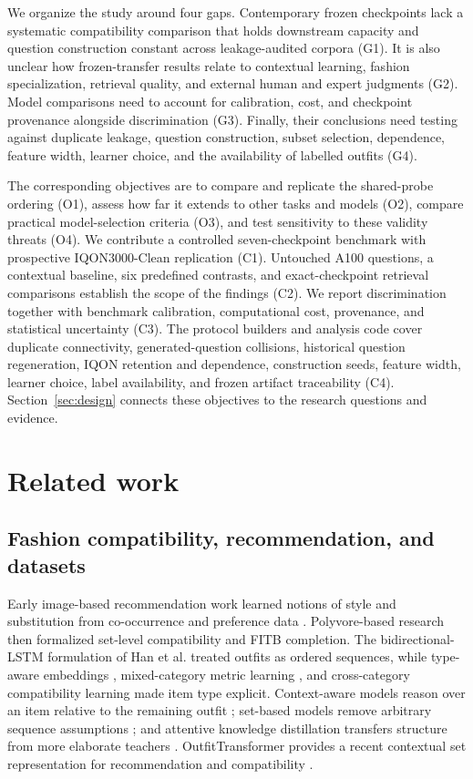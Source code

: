 \documentclass[pdflatex,sn-mathphys-num,iicol]{sn-jnl}
\begin{document}
We organize the study around four gaps. Contemporary frozen checkpoints lack a systematic compatibility comparison that holds downstream capacity and question construction constant across leakage-audited corpora (G1). It is also unclear how frozen-transfer results relate to contextual learning, fashion specialization, retrieval quality, and external human and expert judgments (G2). Model comparisons need to account for calibration, cost, and checkpoint provenance alongside discrimination (G3). Finally, their conclusions need testing against duplicate leakage, question construction, subset selection, dependence, feature width, learner choice, and the availability of labelled outfits (G4).

The corresponding objectives are to compare and replicate the shared-probe ordering (O1), assess how far it extends to other tasks and models (O2), compare practical model-selection criteria (O3), and test sensitivity to these validity threats (O4). We contribute a controlled seven-checkpoint benchmark with prospective IQON3000-Clean replication (C1). Untouched A100 questions, a contextual baseline, six predefined contrasts, and exact-checkpoint retrieval comparisons establish the scope of the findings (C2). We report discrimination together with benchmark calibration, computational cost, provenance, and statistical uncertainty (C3). The protocol builders and analysis code cover duplicate connectivity, generated-question collisions, historical question regeneration, IQON retention and dependence, construction seeds, feature width, learner choice, label availability, and frozen artifact traceability (C4). Section~\ref{sec:design} connects these objectives to the research questions and evidence.

\section{Related work}\label{sec:related}

\subsection{Fashion compatibility, recommendation, and datasets}

Early image-based recommendation work learned notions of style and substitution from co-occurrence and preference data \cite{mcauley2015styles,veit2015style}. Polyvore-based research then formalized set-level compatibility and FITB completion. The bidirectional-LSTM formulation of Han et al. \cite{han2017bilstm} treated outfits as ordered sequences, while type-aware embeddings \cite{vasileva2018typeaware}, mixed-category metric learning \cite{chen2018dress}, and cross-category compatibility learning \cite{polania2019categories} made item type explicit. Context-aware models reason over an item relative to the remaining outfit \cite{cucurull2019context}; set-based models remove arbitrary sequence assumptions \cite{li2017set}; and attentive knowledge distillation transfers structure from more elaborate teachers \cite{song2018attentive}. OutfitTransformer provides a recent contextual set representation for recommendation and compatibility \cite{sarkar2023outfittransformer}.
\end{document}
